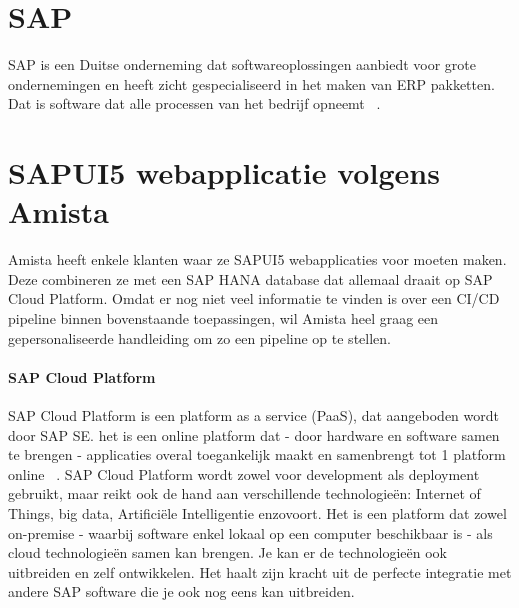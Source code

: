 \section{SAP}
\label{sec:sap}
    SAP is een Duitse onderneming dat softwareoplossingen aanbiedt voor grote ondernemingen en heeft zicht gespecialiseerd in het maken van ERP pakketten. Dat is software dat alle processen van het bedrijf opneemt ~\autocite{SAPERP2019}.

\section{SAPUI5 webapplicatie volgens Amista}
\label{sec:sapui5-sap-hana}
    Amista heeft enkele klanten waar ze SAPUI5 webapplicaties voor moeten maken. Deze combineren ze met een SAP HANA database dat allemaal draait op SAP Cloud Platform. Omdat er nog niet veel informatie te vinden is over een CI/CD pipeline binnen bovenstaande toepassingen, wil Amista heel graag een gepersonaliseerde handleiding om zo een pipeline op te stellen.
     
\paragraph{SAP Cloud Platform}
    SAP Cloud Platform is een platform as a service (PaaS), dat aangeboden wordt door SAP SE. het is een online platform dat - door hardware en software samen te brengen - applicaties overal toegankelijk maakt en samenbrengt tot 1 platform online ~\autocite{SAPSE2018}.
    SAP Cloud Platform wordt zowel voor development als deployment gebruikt, maar reikt ook de hand aan verschillende technologieën: Internet of Things, big data, Artificiële Intelligentie enzovoort. Het is een platform dat zowel on-premise - waarbij software enkel lokaal op een computer beschikbaar is - als cloud technologieën samen kan brengen. Je kan er de technologieën ook uitbreiden en zelf ontwikkelen. Het haalt zijn kracht uit de perfecte integratie met andere SAP software die je ook nog eens kan uitbreiden.

